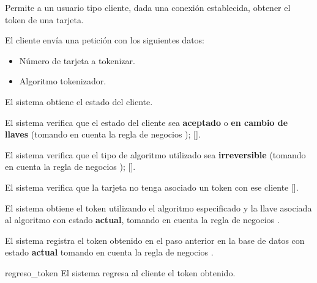 %
%

{
  Permite a un usuario tipo cliente, dada una conexión establecida, obtener el
  token de una tarjeta.

  \begin{trayectoriaPrincipal}

    \item El cliente envía una petición con los siguientes datos:
      \begin{itemize}
        \item Número de tarjeta a tokenizar.
        \item Algoritmo tokenizador.
      \end{itemize}

    \item El sistema obtiene el estado del cliente.

    \item El sistema verifica que el estado del cliente sea \textbf{aceptado} o
      \textbf{en cambio de llaves} (tomando en cuenta la regla de negocios
      );
      [].

    \item El sistema verifica que el tipo de algoritmo utilizado sea
      \textbf{irreversible} (tomando en cuenta la regla de negocios
      );
      [].

    \item El sistema verifica que la tarjeta no tenga asociado un token con ese
      cliente [].

    \item El sistema obtiene el token utilizando el algoritmo especificado y la
      llave asociada al algoritmo con estado \textbf{actual}, tomando en cuenta
      la regla de negocios .

    \item El sistema registra el token obtenido en el paso anterior en la base
      de datos con estado \textbf{actual} tomando en cuenta la regla de negocios
      .

    \item [regreso_token] El sistema regresa al cliente el token obtenido.


\end{trayectoriaPrincipal}}
